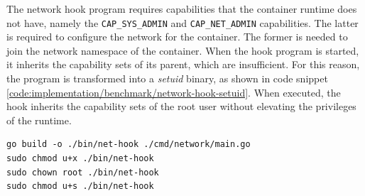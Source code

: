 The network hook program requires capabilities that the container runtime does not have, namely 
the \verb|CAP_SYS_ADMIN| and \verb|CAP_NET_ADMIN| capabilities. The latter is required 
to configure the network for the container. The former is needed to join the network namespace 
of the container. When the hook program is started, it inherits the capability sets of its parent,
which are insufficient. For this reason, the program is transformed into a \textit{setuid} binary, as shown in 
code snippet \ref{code:implementation/benchmark/network-hook-setuid}.
When executed, the hook inherits the capability sets of the root user without elevating the privileges 
of the runtime.

\begin{lstlisting}[label={code:implementation/benchmark/network-hook-setuid}, style=bash, caption={Building the network hook, changing its ownership and transforming it into a setuid binary by setting the respective permission bit}]
go build -o ./bin/net-hook ./cmd/network/main.go 
sudo chmod u+x ./bin/net-hook
sudo chown root ./bin/net-hook
sudo chmod u+s ./bin/net-hook
\end{lstlisting}

